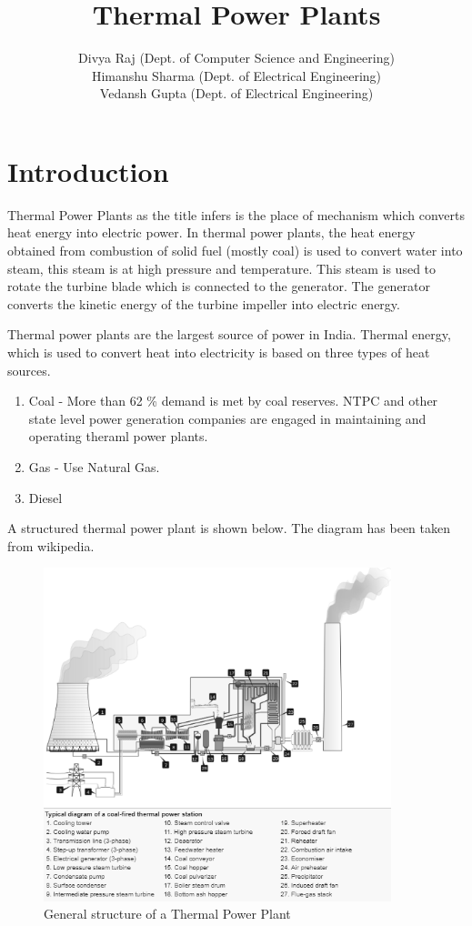 \documentclass{report}
\title{Thermal Power Plants}
\author{Divya Raj (Dept. of Computer Science and Engineering) \\ Himanshu Sharma (Dept. of Electrical Engineering) \\ Vedansh Gupta (Dept. of Electrical Engineering)}
\date{}
\begin{document}
\maketitle
\tableofcontents
\newpage
\renewcommand{\thesection}{\arabic{section}}
\section{Introduction}
Thermal Power Plants as the title infers is the place of mechanism which converts heat energy into electric power. In thermal power plants, the heat energy obtained from combustion of solid fuel (mostly coal) is used to convert water into steam, this steam is at high pressure and temperature. This steam is used to rotate the turbine blade which is connected to the generator. The generator converts the kinetic energy of the turbine impeller into electric energy.
\par Thermal power plants are the largest source of power in India. Thermal energy, which is used to convert heat into electricity is based on three types of heat sources.
\begin{enumerate}
\item{Coal - More than 62 \% demand is met by coal reserves. NTPC and other state level power generation companies are engaged in maintaining and operating theraml power plants.}
\item{Gas - Use Natural Gas.}
\item{Diesel}
\end{enumerate}
A structured thermal power plant is shown below. The diagram has been taken from wikipedia.

\begin{figure}[H]
\centering \includegraphics[width=0.9\textwidth]{images/tpp1.png}
\caption{General structure of a Thermal Power Plant}
\end{figure}
\end{document}
